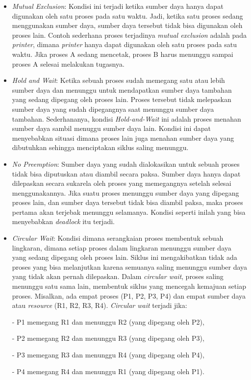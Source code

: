 \documentclass[12pt]{article}
\begin{document}
\begin{itemize}

    \item \textit{Mutual Exclusion}: Kondisi ini terjadi ketika sumber daya hanya dapat digunakan oleh satu proses pada satu waktu. Jadi, ketika satu proses sedang menggunakan sumber daya, sumber daya tersebut tidak bisa digunakan oleh proses lain. Contoh sederhana proses terjadinya \textit{mutual exclusion} adalah pada \textit{printer}, dimana \textit{printer} hanya dapat digunakan oleh satu proses pada satu waktu. Jika proses A sedang mencetak, proses B harus menunggu sampai proses A selesai melakukan tugasnya.
    
    \item \textit{Hold and Wait}: Ketika sebuah proses sudah memegang satu atau lebih sumber daya dan menunggu untuk mendapatkan sumber daya tambahan yang sedang dipegang oleh proses lain. Proses tersebut tidak melepaskan sumber daya yang sudah dipegangnya saat menunggu sumber daya tambahan. Sederhananya, kondisi \textit{Hold-and-Wait} ini adalah proses menahan sumber daya sambil menuggu sumber daya lain.  Kondisi ini dapat menyebabkan situasi dimana proses lain juga menahan sumber daya yang dibutuhkan sehingga menciptakan siklus saling menunggu.
    
    \item \textit{No Preemption}:  Sumber daya yang sudah dialokasikan untuk sebuah proses tidak bisa diputuskan atau diambil secara paksa. Sumber daya hanya dapat dilepaskan secara sukarela oleh proses yang memegangnya setelah selesai menggunakannya. Jika suatu proses menunggu sumber daya yang dipegang proses lain, dan sumber daya tersebut tidak bisa diambil paksa, maka proses pertama akan terjebak menunggu selamanya. Kondisi seperti inilah yang bisa menyebabkan \textit{deadlock} itu terjadi.
    
    \item \textit{Circular Wait}:  Kondisi dimana serangkaian proses membentuk sebuah lingkaran, dimana setiap proses dalam lingkaran menunggu sumber daya yang sedang dipegang oleh proses lain. Siklus ini mengakibatkan tidak ada proses yang bisa melanjutkan karena semuanya saling menunggu sumber daya yang tidak akan pernah dilepaskan. Dalam \textit{circular wait}, proses saling menunggu satu sama lain, membentuk siklus yang mencegah kemajuan setiap proses. Misalkan, ada empat proses (P1, P2, P3, P4) dan empat sumber daya atau \textit{resource} (R1, R2, R3, R4). \textit{Circular wait} terjadi jika:

    - P1 memegang R1 dan menunggu R2 (yang dipegang oleh P2),
    
    - P2 memegang R2 dan menunggu R3 (yang dipegang oleh P3),
    
    - P3 memegang R3 dan menunggu R4 (yang dipegang oleh P4),
    
    - P4 memegang R4 dan menunggu R1 (yang dipegang oleh P1).
\end{itemize}
\begin{enumerate}

\end{enumerate}
\end{document}
